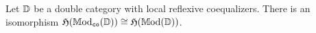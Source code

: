 \documentclass[a4paper,dvipsnames, 11pt]{amsart} %
\begin{document}
\begin{lemma}
	Let $\mathbb{D}$ be a double category with local reflexive coequalizers.
	There is an isomorphism ${\mathfrak{H}}(\mathbb{M}\mathrm{od}_{\mathtt{co}}(\mathbb{D}))\cong{\mathfrak{H}}(\mathbb{M}\mathrm{od}(\mathbb{D}))$.
\end{lemma}
\begin{definition}
\end{definition}



\end{document}
